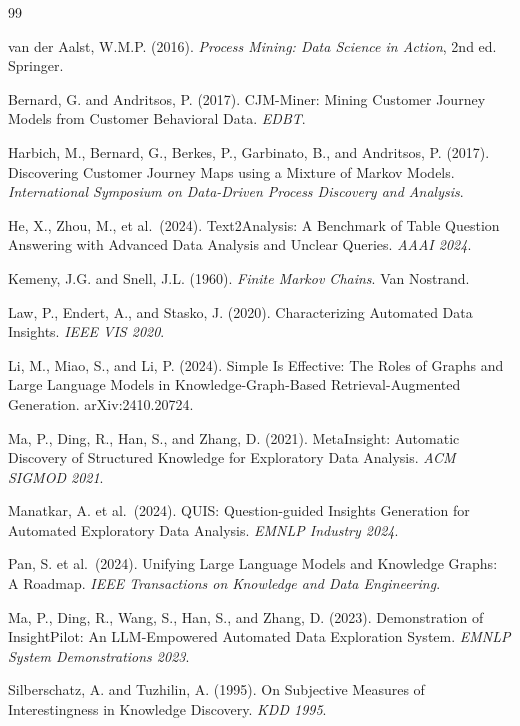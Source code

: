 \documentclass[12pt, a4paper]{article}
\begin{document}
\begin{thebibliography}{99}

van der Aalst, W.M.P. (2016).
\textit{Process Mining: Data Science in Action}, 2nd ed.
Springer.

Bernard, G. and Andritsos, P. (2017).
CJM-Miner: Mining Customer Journey Models from Customer Behavioral Data.
\textit{EDBT}.

Harbich, M., Bernard, G., Berkes, P., Garbinato, B., and Andritsos, P. (2017).
Discovering Customer Journey Maps using a Mixture of Markov Models.
\textit{International Symposium on Data-Driven Process Discovery and Analysis}.

He, X., Zhou, M., et al.\ (2024).
Text2Analysis: A Benchmark of Table Question Answering with Advanced Data Analysis and Unclear Queries.
\textit{AAAI 2024}.

Kemeny, J.G. and Snell, J.L. (1960).
\textit{Finite Markov Chains}.
Van Nostrand.

Law, P., Endert, A., and Stasko, J. (2020).
Characterizing Automated Data Insights.
\textit{IEEE VIS 2020}.

Li, M., Miao, S., and Li, P. (2024).
Simple Is Effective: The Roles of Graphs and Large Language Models in
Knowledge-Graph-Based Retrieval-Augmented Generation.
arXiv:2410.20724.

Ma, P., Ding, R., Han, S., and Zhang, D. (2021).
MetaInsight: Automatic Discovery of Structured Knowledge for Exploratory Data Analysis.
\textit{ACM SIGMOD 2021}.

Manatkar, A. et al.\ (2024).
QUIS: Question-guided Insights Generation for Automated Exploratory Data Analysis.
\textit{EMNLP Industry 2024}.

Pan, S. et al.\ (2024).
Unifying Large Language Models and Knowledge Graphs: A Roadmap.
\textit{IEEE Transactions on Knowledge and Data Engineering}.

Ma, P., Ding, R., Wang, S., Han, S., and Zhang, D. (2023).
Demonstration of InsightPilot: An LLM-Empowered Automated Data Exploration System.
\textit{EMNLP System Demonstrations 2023}.

Silberschatz, A. and Tuzhilin, A. (1995).
On Subjective Measures of Interestingness in Knowledge Discovery.
\textit{KDD 1995}.


\end{thebibliography}
\end{document}
